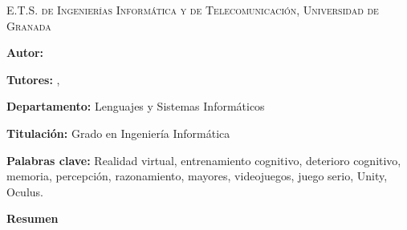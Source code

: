 
\pagestyle{fancy}
\renewcommand{\headrulewidth}{0pt}

\begin{center}
	\scshape
	E.T.S. de Ingenierías Informática y de Telecomunicación, Universidad de Granada
\end{center}

\bigskip

\begin{center}
	\Large \scshape
	\textbf{\tfgtitlename}
\end{center}

\bigskip \bigskip \bigskip

\begin{minipage}{\textwidth}

\textbf{Autor:} \tfgauthorname

\medskip

\textbf{Tutores:} \tfgtutornameA , \tfgtutornameB

\medskip


\medskip

\textbf{Departamento:} Lenguajes y Sistemas Informáticos

\medskip

\textbf{Titulación:} Grado en Ingeniería Informática

\medskip

\textbf{Palabras clave:} Realidad virtual, entrenamiento cognitivo, deterioro cognitivo, memoria, percepción, razonamiento, mayores, videojuegos, juego serio, Unity, Oculus.

\bigskip \bigskip


\end{minipage}

\begin{center}
	\textbf{Resumen}
\end{center}





